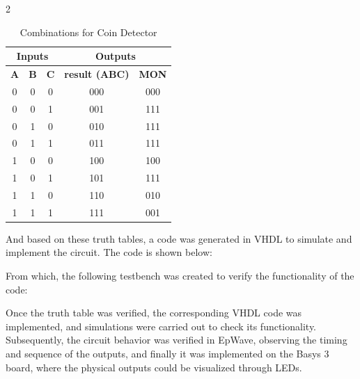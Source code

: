 \documentclass{article}
\begin{document}
\begin{multicols}{2}
\begin{table}[H]
\centering
\begin{tabular}{|c|c|c|c|c|}
\hline
\multicolumn{3}{|c|}{\textbf{Inputs}} & \multicolumn{2}{c|}{\textbf{Outputs}} \\
\hline
\textbf{A} & \textbf{B} & \textbf{C} & \textbf{result (ABC)} & \textbf{MON} \\ \hline
0 & 0 & 0 & 000 & 000 \\
0 & 0 & 1 & 001 & 111 \\
0 & 1 & 0 & 010 & 111 \\
0 & 1 & 1 & 011 & 111 \\
1 & 0 & 0 & 100 & 100 \\
1 & 0 & 1 & 101 & 111 \\
1 & 1 & 0 & 110 & 010 \\
1 & 1 & 1 & 111 & 001 \\ \hline
\end{tabular}
\caption{Combinations for Coin Detector }
\label{tab:Money_truth_table}
\end{table}
And based on these truth tables, a code was generated in VHDL to simulate and implement the circuit. The code is shown below:

From which, the following testbench was created to verify the functionality of the code:

Once the truth table was verified, the corresponding VHDL code was implemented, and simulations were carried out to check its functionality. Subsequently, the circuit behavior was verified in EpWave, observing the timing and sequence of the outputs, and finally it was implemented on the Basys 3 board, where the physical outputs could be visualized through LEDs. 


\end{multicols}
\end{document}
